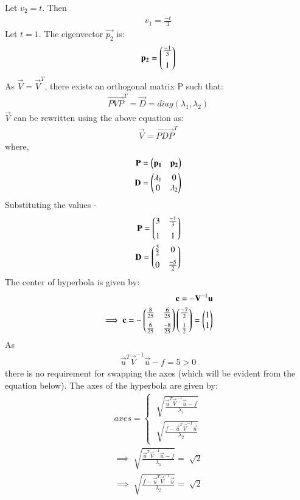 \documentclass[journal,12pt,twocolumn]{IEEEtran}
\begin{document}
Let $v_2 = t$. Then
\begin{align}
  v_1 = \frac{-t}{3}
\end{align}
Let $t = 1$. The eigenvector $\vec{p_2}$ is:
\begin{align}
  \mathbf{p_2} = \begin{pmatrix}\frac{-1}{3} \\[0.2cm] 1\end{pmatrix}
\end{align}
As $\vec{V} = \vec{V}^T$, there exists an orthogonal matrix P such that:
\begin{align}
  \vec{PVP}^T = \vec{D} = diag(\lambda_1, \lambda_2)
\end{align}
$\vec{V}$ can be rewritten using the above equation as:
\begin{align}
  \vec{V} = \vec{PDP}^T
\end{align}
where,
\begin{align}
  \mathbf{P} = \begin{pmatrix}\mathbf{p_1} & \mathbf{p_2}\end{pmatrix} \\
  \mathbf{D} = \begin{pmatrix}\lambda_1 & 0 \\ 0 & \lambda_2\end{pmatrix}
\end{align}
Substituting the values -
\begin{align}
  \mathbf{P} = \begin{pmatrix}3 & \frac{-1}{3}\\[0.2cm] 1 & 1\end{pmatrix} \\
  \mathbf{D} = \begin{pmatrix}\frac{5}{2} & 0 \\[0.2cm] 0 & \frac{-5}{2}\end{pmatrix}
\end{align}
The center of hyperbola is given by:
\begin{align}
  \mathbf{c} = -\mathbf{V}^{-1}\mathbf{u} \\
  \implies \mathbf{c} = -\begin{pmatrix}\frac{8}{25} & \frac{6}{25} \\[0.2cm] \frac{6}{25} & \frac{-8}{25}\end{pmatrix} \begin{pmatrix}\frac{-7}{2} \\[0.2cm]\frac{1}{2}\end{pmatrix} = \begin{pmatrix}1 \\ 1\end{pmatrix}
\end{align}
As
\begin{align}
  \vec{u}^T\vec{V}^{-1}\vec{u} - f = 5 > 0
\end{align}
there is no requirement for swapping the axes (which will be evident from the equation below). The axes of the hyperbola are given by:
\begin{align}
  axes = \begin{cases}
    \sqrt[]{\frac{\vec{u}^T\vec{V}^{-1}\vec{u} - f}{\lambda_1}} \\
    \sqrt[]{\frac{f - \vec{u}^T\vec{V}^{-1}\vec{u}}{\lambda_2}}
  \end{cases} \\
  \implies \sqrt[]{\frac{\vec{u}^T\vec{V}^{-1}\vec{u} - f}{\lambda_1}} = \sqrt[]{2} \\
  \implies \sqrt[]{\frac{f - \vec{u}^T\vec{V}^{-1}\vec{u}}{\lambda_2}} = \sqrt[]{2}
\end{align}
\end{document}

